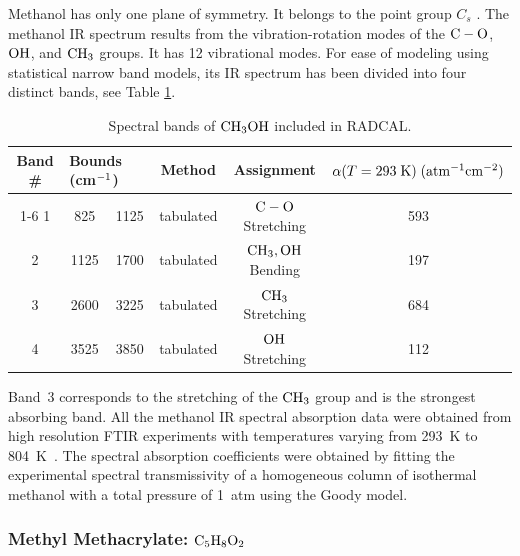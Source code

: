 Methanol has only one plane of symmetry. It belongs to the point group $C_{s}$ \cite{Herzberg:1949}. The methanol IR spectrum results from the vibration-rotation modes of the $\rm C-O$, $\rm OH$, and $\rm CH_3$ groups. It has 12 vibrational modes. For ease of modeling using statistical narrow band models, its IR spectrum has been divided into four distinct bands, see Table \ref{Table::CH3OH}.
\begin{table}[ht]
   \centering
   \caption[Spectral bands of $\rm CH_3OH$ included in RADCAL]{Spectral bands of $\rm CH_3OH$ included in RADCAL.}
   \vspace{0.1in}
   \label{Table::CH3OH}
   \begin{tabular}{|c|c|c|c|c|c|}
    \hline
    Band \# & \multicolumn{2}{|l|}{Bounds (cm$\rm ^{-1}$) } & Method & Assignment &  $\alpha(T=293 \; {\rm K}) \; (\rm {atm^{-1} cm^{-2}})$ \\
    \cline{1-6}
    1 & 825  & 1125 & tabulated & $\rm C-O$ Stretching   & 593 \\
    2 & 1125 & 1700 & tabulated & $\rm CH_3, OH$ Bending & 197 \\
    3 & 2600 & 3225 & tabulated & $\rm CH_3$ Stretching  & 684 \\
    4 & 3525 & 3850 & tabulated & $\rm OH$ Stretching    & 112 \\
    \hline
   \end{tabular}
\end{table}
Band~3 corresponds to the stretching of the $\rm CH_3$ group and is the strongest absorbing band. All the methanol IR spectral absorption data were obtained from high resolution FTIR experiments with temperatures varying from 293~K to 804~K~\cite{Wakatsuki:2005}. The spectral absorption coefficients were obtained by fitting the experimental spectral transmissivity of a homogeneous column of isothermal methanol with a total pressure of 1~atm using the Goody model.

\subsubsection{Methyl Methacrylate: $\rm C_5H_8O_2$}

